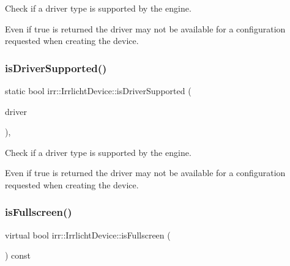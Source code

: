 Check if a driver type is supported by the engine. 

Even if true is returned the driver may not be available for a configuration requested when creating the device. \mbox{\label{classirr_1_1IrrlichtDevice_a5a74995aec731b26c6a9cb5bea6842fe}} 
\subsubsection{\texorpdfstring{is\+Driver\+Supported()}{isDriverSupported()}\hspace{0.1cm}{\footnotesize\ttfamily [2/2]}}
{\footnotesize\ttfamily static bool irr\+::\+Irrlicht\+Device\+::is\+Driver\+Supported (\begin{DoxyParamCaption}\item[{\hyperlink{namespaceirr_1_1video_ae35a6de6d436c76107ad157fe42356d0}{video\+::\+E\+\_\+\+D\+R\+I\+V\+E\+R\+\_\+\+T\+Y\+PE}}]{driver }\end{DoxyParamCaption})\hspace{0.3cm}{\ttfamily [inline]}, {\ttfamily [static]}}



Check if a driver type is supported by the engine. 

Even if true is returned the driver may not be available for a configuration requested when creating the device. \mbox{\label{classirr_1_1IrrlichtDevice_a409df5e9b9b90635bd3c2db31978a5c1}} 
\subsubsection{\texorpdfstring{is\+Fullscreen()}{isFullscreen()}\hspace{0.1cm}{\footnotesize\ttfamily [1/2]}}
{\footnotesize\ttfamily virtual bool irr\+::\+Irrlicht\+Device\+::is\+Fullscreen (\begin{DoxyParamCaption}{ }\end{DoxyParamCaption}) const\hspace{0.3cm}{\ttfamily [pure virtual]}}



